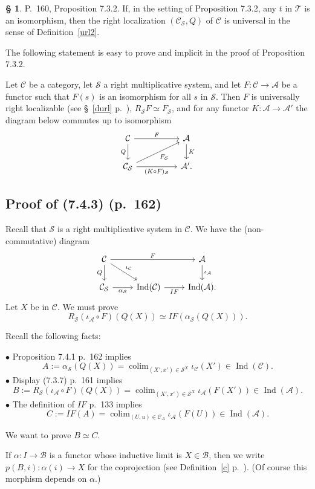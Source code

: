 \documentclass[12pt]{article}%
\theoremstyle{remark}
\theoremstyle{definition}
\newtheorem{s}[thm]{\S}%
\newcommand{\bu}{\bullet}
\newcommand{\cc}{\mathcal}
\newcommand{\A}{\mathcal A}
\newcommand{\B}{\mathcal B}
\newcommand{\C}{\mathcal C}
\newcommand{\SSS}{\mathcal S}
\DeclareMathOperator*{\colim}{colim}
\DeclareMathOperator{\Ind}{Ind}
\begin{document}
%

\begin{s}\label{732} 
P.~160, Proposition 7.3.2. If, in the setting of Proposition 7.3.2, any $t$ in $\cc T$ is an isomorphism, then the right localization $(\C_{\cc S},Q)$ of $\C$ is universal in the sense of Definition~\ref{url2}.

The following statement is easy to prove and implicit in the proof of Proposition 7.3.2. 

Let $\C$ be a category, let $\SSS$ a right multiplicative system, and let $F:\C\to\A$ be a functor such that $F(s)$ is an isomorphism for all $s$ in $\SSS$. Then $F$ is universally right localizable (see \S~\ref{durl} p.~\pageref{durl}), $R_{\SSS}F\simeq F_{\SSS}$, and for any functor $K:\A\to\A'$ the diagram below commutes up to isomorphism
$$
\begin{tikzcd}
\C\ar{rr}{F}\ar{d}[swap]{Q}&&\A\ar{d}{K}\\
\C_{\SSS}\ar{rr}[swap]{(K\circ F)_{\SSS}}\ar{rru}[swap]{F_{\SSS}}&&\A'.
\end{tikzcd}
$$
\end{s}


\subsection{Proof of (7.4.3) (p.~162)}

Recall that $\SSS$ is a right multiplicative system in $\C$. We have the (non-commutative) diagram
$$
\begin{tikzcd}
\C\ar{rr}{F}\ar{d}[swap]{Q}\ar{dr}{\iota_\C}&&\A\ar{d}{\iota_\A}\\ 
\C_\SSS\ar{r}[swap]{\alpha_\SSS}&\Ind(\C)\ar{r}[swap]{IF}&\Ind(\A).
\end{tikzcd}
$$
Let $X$ be in $\C$. We must prove 
$$
R_\SSS(\iota_\A\circ F)(Q(X))\simeq IF(\alpha_\SSS(Q(X))).
$$

Recall the following facts: 

\noindent$\bu$ Proposition 7.4.1 p.~162 implies
$$
A:=\alpha_\SSS(Q(X))=\colim_{(X',x')\in\SSS^X}\iota_\C(X')\in\Ind(\C).
$$ 
$\bu$ Display (7.3.7) p.~161 implies
$$
B:=R_\SSS(\iota_\A\circ F)(Q(X))=\colim_{(X',x')\in\SSS^X}\iota_\A(F(X'))\in\Ind(\A).
$$
$\bu$ The definition of $IF$ p.~133 implies
$$
C:=IF(A)=\colim_{(U,u)\in\C_A}\iota_\A(F(U))\in\Ind(\A).
$$

We want to prove $B\simeq C$.

 If $\alpha:I\to\B$ is a functor whose inductive limit is $X\in\B$, then we write $p(B,i):\alpha(i)\to X$ for the coprojection (see Definition~\ref{c} p.~\pageref{c}). (Of course this morphism depends on $\alpha$.) 
\end{document}
